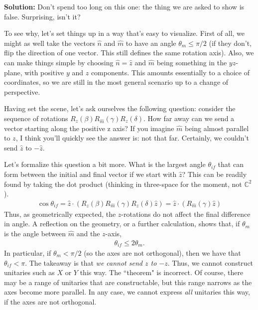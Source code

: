 \documentclass{book}
\begin{document}
    \textbf{Solution:} Don't spend too long on this one: the thing we are asked to show is false. Surprising, isn't it? 
    
    To see why, let's set things up in a way that's easy to visualize. First of all, we might as well take the vectors $\hat{n}$ and $\hat{m}$ to have an angle $\theta_m \leq \pi/2$ (if they don't, flip the direction of one vector. This still defines the same rotation axis). Also, we can make things simple by choosing $\hat{n} = \hat{z}$ and $\hat{m}$ being something in the $yz$-plane, with positive $y$ and $z$ components. This amounts essentially to a choice of coordinates, so we are still in the most general scenario up to a change of perspective.

    Having set the scene, let's ask ourselves the following question: consider the sequence of rotations $R_z(\beta) R_{\hat{m}}(\gamma) R_z(\delta)$. How far away can we send a vector starting along the positive z axis? If you imagine $\hat{m}$ being almost parallel to $z$, I think you'll quickly see the answer is: not that far. Certainly, we couldn't send $\hat{z}$ to $-\hat{z}$. 

    Let's formalize this question a bit more. What is the largest angle $\theta_{if}$ that can form between the initial and final vector if we start with $\hat{z}$? This can be readily found by taking the dot product (thinking in three-space for the moment, not $\mathbb{C}^2$).
    \begin{align}
        \cos \theta_{if} = \hat{z} \cdot (R_z(\beta) R_{\hat{m}}(\gamma) R_z(\delta) \hat{z}) = \hat{z} \cdot (R_{\hat{m}}(\gamma) \hat{z})
    \end{align}
    Thus, as geometrically expected, the $z$-rotations do not affect the final difference in angle. A reflection on the geometry, or a further calculation, shows that, if $\theta_m$ is the angle between $\hat{m}$ and the $z$-axis,
    \begin{align}
        \theta_{if} \leq 2 \theta_m.
    \end{align}
    In particular, if $\theta_m < \pi/2$ (so the axes are not orthogonal), then we have that $\theta_{if} < \pi$. The takeaway is that \emph{we cannot send $z$ to $-z$}. Thus, we cannot construct unitaries such as $X$ or $Y$ this way. The ``theorem" is incorrect. Of course, there may be a range of unitaries that are constructable, but this range narrows as the axes become more parallel. In any case, we cannot express \emph{all} unitaries this way, if the axes are not orthogonal.
\end{document}
